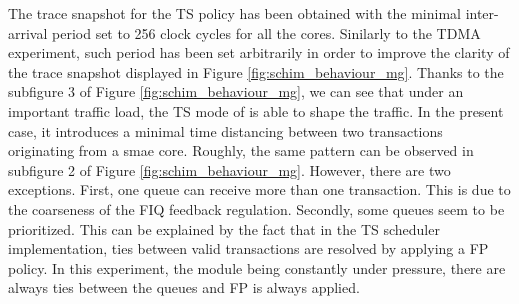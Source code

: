        The trace snapshot for the TS policy has been obtained with the minimal inter-arrival period set to 256 clock cycles for all the cores. Sinilarly to the TDMA experiment, such period has been set arbitrarily in order to improve the clarity of the trace snapshot displayed in Figure \ref{fig:schim_behaviour_mg}.
       Thanks to the subfigure 3 of Figure \ref{fig:schim_behaviour_mg}, we can see that under an important traffic load, the TS mode of \schim is able to shape the traffic. In the present case, it introduces a minimal time distancing between two transactions originating from a smae core.
       Roughly, the same pattern can be observed in subfigure 2 of Figure \ref{fig:schim_behaviour_mg}. However, there are two exceptions. First, one queue can receive more than one transaction. This is due to the coarseness of the FIQ feedback regulation. Secondly, some queues seem to be prioritized. This can be explained by the fact that in the TS scheduler implementation, ties between valid transactions are resolved by applying a FP policy. In this experiment, the \schim module being constantly under pressure, there are always ties between the queues and FP is always applied.
